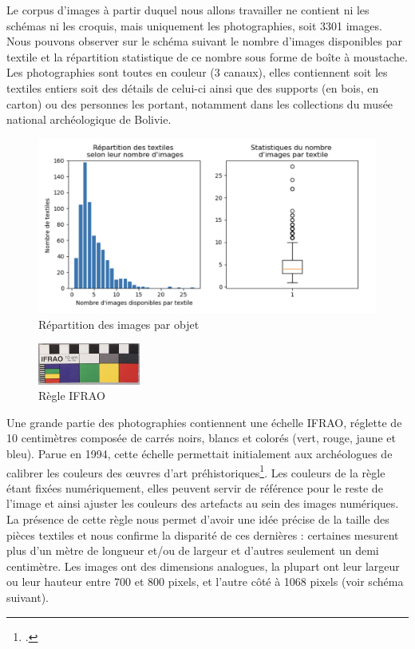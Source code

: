 \noindent Le corpus d'images à partir duquel nous allons travailler ne contient ni les schémas ni les croquis, mais uniquement les photographies, soit 3301 images. Nous pouvons observer sur le schéma suivant le nombre d'images disponibles par textile et la répartition statistique de ce nombre sous forme de boîte à moustache. Les photographies sont toutes en couleur (3 canaux), elles contiennent soit les textiles entiers soit des détails de celui-ci ainsi que des supports (en bois, en carton) ou des personnes les portant, notamment dans les collections du musée national archéologique de Bolivie. 

\begin{figure}[!h]
	\begin{center}
		\includegraphics[width=16cm]{../images/nbImages.png}
	 \end{center}
	 \caption{Répartition des images par objet}
\end{figure}

\begin{figure}
    \centering
    \includegraphics[width=0.3\textwidth]{../images/IFRAO.jpg}
    \caption{Règle IFRAO}
    \label{fig:IFRAO}
\end{figure}



Une grande partie des photographies contiennent une échelle IFRAO, réglette de 10 centimètres composée de carrés noirs, blancs et colorés (vert, rouge, jaune et bleu). Parue en 1994, cette échelle permettait initialement aux archéologues de calibrer les couleurs des \oe{}uvres d'art préhistoriques\footcite[p.~225]{lopezIFRAOStandardScale2009}. Les couleurs de la règle étant fixées numériquement, elles peuvent servir de référence pour le reste de l'image et ainsi ajuster les couleurs des artefacts au sein des images numériques. La présence de cette règle nous permet d'avoir une idée précise de la taille des pièces textiles et nous confirme la disparité de ces dernières : certaines mesurent plus d'un mètre de longueur et/ou de largeur et d'autres seulement un demi centimètre. Les images ont des dimensions analogues, la plupart ont leur largeur ou leur hauteur entre 700 et 800 pixels, et l'autre côté à 1068 pixels (voir schéma suivant).

